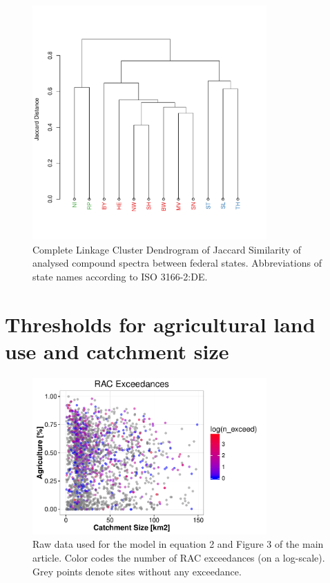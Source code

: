 \documentclass[pdftex,a4paper]{scrreprt}
\begin{document}
\begin{figure}[h]
	\centering
	\includegraphics[width = 0.8\textwidth]{varclus}
	\caption[Complete Linkage Cluster Dendrogram of Jaccard Similarity of analysed compound spectra between federal states.]{Complete Linkage Cluster Dendrogram of Jaccard Similarity of analysed compound spectra between federal states. Abbreviations of state names according to ISO 3166-2:DE.}
	\label{fig:varclus}
\end{figure}






\chapter{Thresholds for agricultural land use and catchment size}
\begin{figure}[h]
	\centering
	\includegraphics[width = 0.8\textwidth]{ezgagrirac}
	\caption[Raw data used for the model in equation 2 and Figure 3 of the main article.]{Raw data used for the model in equation 2 and Figure 3 of the main article. Color codes the number of RAC exceedances (on a log-scale). Grey points denote sites without any exceedance.}
	\label{fig:ezgagrirac}
\end{figure}
\end{document}
